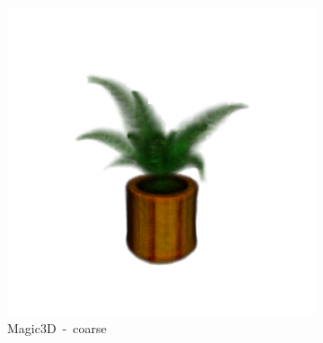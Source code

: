 \begin{figure}[ht]
    \centering
    \small
    \begin{subfigure}[b]{0.35\textwidth}
        \centering
        \includegraphics[width=\textwidth]{figures/subjective/magic3D_fern_coarse_part1.png}
        \caption{Magic3D~-~coarse}
    \end{subfigure}
    \begin{subfigure}[b]{0.2\textwidth}
        \centering

\end{subfigure}
\end{figure}
